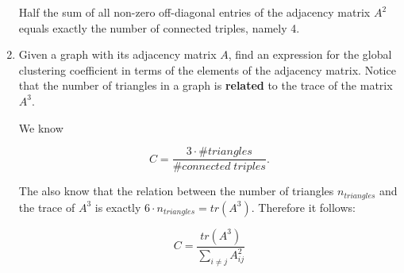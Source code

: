 \begin{enumerate}
	Half the sum of all non-zero off-diagonal entries of the adjacency matrix $A^2$ equals exactly the number of connected triples, namely 4. 
	
	\item Given a graph with its adjacency matrix $A$, find an expression for the global clustering coefficient in terms of the elements of the adjacency matrix. Notice that the number of triangles in a graph is \textbf{related} to the trace of the matrix $A^3$.
	
	We know 
	
	\begin{equation*}
		C = \frac{3 \cdot \#triangles}{\#connected \; triples}.
	\end{equation*}
	
	The also know that the relation between the number of triangles $n_{triangles}$ and the trace of $A^3$ is exactly $6 \cdot n_{triangles} = tr(A^3)$. Therefore it follows:
	
	\begin{equation*}
		C = \frac{tr(A^3)}{\sum_{i \neq j} A^2_{ij}}
	\end{equation*}

\end{enumerate}